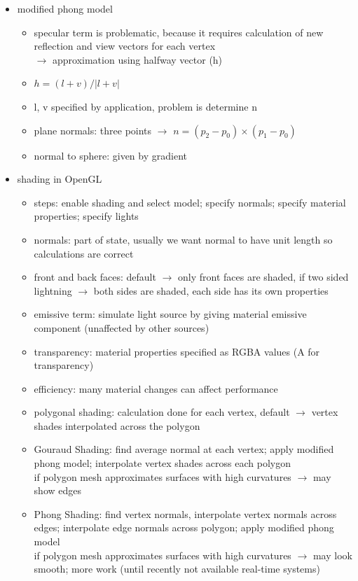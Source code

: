 \documentclass[11pt,a4paper]{article}
\begin{document}
\begin{itemize}
	\item modified phong model
	\begin{itemize}
		\item specular term is problematic, because it requires calculation of new reflection and view vectors for each vertex\\
		$\rightarrow$ approximation using halfway vector (h)
		\item $h=(l+v)/|l+v|$
		\item l, v specified by application, problem is determine n
		\item plane normals: three points $\rightarrow$  $n=(p_2-p_0)\times(p_1-p_0)$
		\item normal to sphere: given by gradient
		
	\end{itemize}
	\item shading in OpenGL
	\begin{itemize}
		\item steps: enable shading and select model; specify normals; specify material properties; specify lights
		\item normals: part of state, usually we want normal to have unit length so calculations are correct
		\item front and back faces: default $\rightarrow$ only front faces are shaded, if two sided lightning $\rightarrow$ both sides are shaded, each side has its own properties
		\item emissive term: simulate light source by giving material emissive component (unaffected by other sources)
		\item transparency: material properties specified as RGBA values (A for transparency)
		\item efficiency: many material changes can affect performance
		\item polygonal shading: calculation done for each vertex, default $\rightarrow$ vertex shades interpolated across the polygon
		\item Gouraud Shading: find average normal at each vertex; apply modified phong model; interpolate vertex shades across each polygon\\
			if polygon mesh approximates surfaces with high curvatures $\rightarrow$ may show edges
		\item Phong Shading: find vertex normals, interpolate vertex normals across edges; interpolate edge normals across polygon; apply modified phong model\\
			if polygon mesh approximates surfaces with high curvatures $\rightarrow$ may look smooth; more work (until recently not available real-time systems)
	\end{itemize}
\end{itemize}
\end{document}
